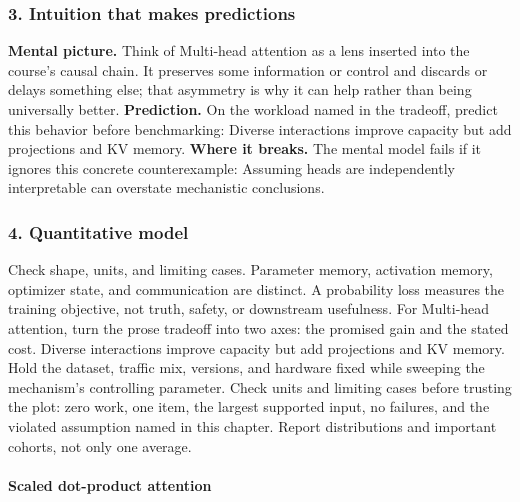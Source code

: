 \subsubsection*{3. Intuition that makes predictions}
\textbf{Mental picture.} Think of Multi-head attention as a lens inserted into the course's causal chain. It preserves some information or control and discards or delays something else; that asymmetry is why it can help rather than being universally better.
\textbf{Prediction.} On the workload named in the tradeoff, predict this behavior before benchmarking: Diverse interactions improve capacity but add projections and KV memory.
\textbf{Where it breaks.} The mental model fails if it ignores this concrete counterexample: Assuming heads are independently interpretable can overstate mechanistic conclusions.
\subsubsection*{4. Quantitative model}
Check shape, units, and limiting cases. Parameter memory, activation memory, optimizer state, and communication are distinct. A probability loss measures the training objective, not truth, safety, or downstream usefulness.
For Multi-head attention, turn the prose tradeoff into two axes: the promised gain and the stated cost. Diverse interactions improve capacity but add projections and KV memory. Hold the dataset, traffic mix, versions, and hardware fixed while sweeping the mechanism's controlling parameter.
Check units and limiting cases before trusting the plot: zero work, one item, the largest supported input, no failures, and the violated assumption named in this chapter. Report distributions and important cohorts, not only one average.
\paragraph{Scaled dot-product attention}
